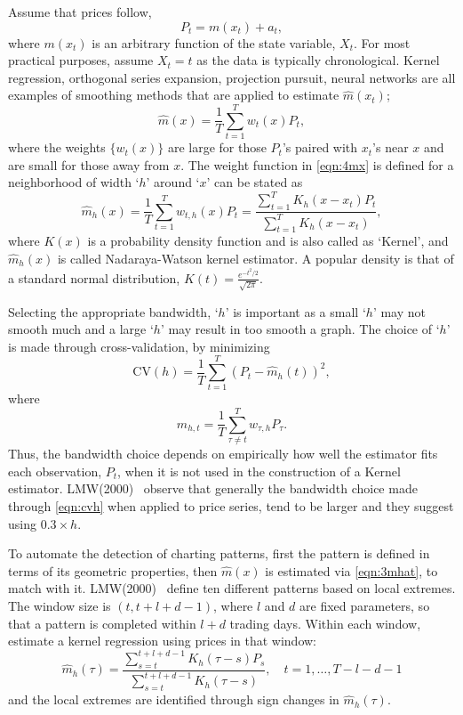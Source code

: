 Assume that prices follow,
	\begin{equation} \label{eqn:4pt}
	P_{t} = m(x_{t}) + a_{t},
	\end{equation}
where $m(x_{t})$ is an arbitrary function of the state variable, $X_{t}$. For most practical purposes, assume $X_{t}= t$ as the data is typically chronological. Kernel regression, orthogonal series expansion, projection pursuit, neural networks are all examples of smoothing methods that are applied to estimate $\hat{m}(x_{t})$;
	\begin{equation} \label{eqn:4mx}
	\hat{m}(x) = \frac{1}{T} \sum_{t=1}^Tw_{t}(x)P_{t},
	\end{equation}
where the weights $\{w_{t}(x)\}$ are large for those $P_{t}$'s paired with $x_{t}$'s near $x$ and are small for those away from $x$. The weight function in \eqref{eqn:4mx} is defined for a neighborhood of width `$h$'  around `$x$' can be stated as
	\begin{equation} \label{eqn:3mhat}
	\hat{m}_{h}(x) = \frac{1}{T}\sum_{t=1}^T w_{t,h}(x)P_{t} = \dfrac{\sum_{t=1}^T K_{h}(x-x_{t})P_{t}}{\sum_{t=1}^T K_{h}(x-x_{t})},
	\end{equation}
where $K(x)$ is a probability density function and is also called as `Kernel', and $\hat{m}_{h}(x)$ is called Nadaraya-Watson kernel estimator. A popular density is that of a standard normal distribution, $K(t)=\frac{e^{-t^2/2}}{\sqrt{2\pi}}$.


Selecting the appropriate bandwidth, `$h$' is important as a small `$h$' may not smooth much and a large `$h$' may result in too smooth a graph. The choice of `$h$' is made through cross-validation, by minimizing
	\begin{equation}\label{eqn:cvh}
	\text{CV}(h) = \frac{1}{T}\sum_{t=1}^T (P_{t} - \hat{m}_{h}(t))^2,
	\end{equation}
where
	\begin{equation}\label{eqn:mht}
	\hat{m}_{h,t} = \frac{1}{T}\sum_{\tau\not=t}^T w_{\tau,h}P_{\tau}.
	\end{equation}
Thus, the bandwidth choice depends on empirically how well the estimator fits each observation, $P_{t}$, when it is not used in the construction of a Kernel estimator. LMW(2000)~\cite{LoMWang} observe that generally the bandwidth choice made through \eqref{eqn:cvh} when applied to price series, tend to be larger and they suggest using $0.3 \times h$.


To automate the detection of charting patterns, first the pattern is defined in terms of its geometric properties, then $\hat{m}(x)$ is estimated via \eqref{eqn:3mhat}, to match with it. LMW(2000)~\cite{LoMWang} define ten different patterns based on local extremes. The window size is $(t,t+l+d-1)$, where $l$ and $d$ are fixed parameters, so that a pattern is completed within $l+d$ trading days. Within each window, estimate  a kernel regression using prices in that window:
	\begin{equation} \label{eqn:longhat}
	\hat{m}_{h}(\tau) = \dfrac{\sum_{s = t}^{t+l+d-1}K_{h}(\tau - s)P_{s}}{\sum_{s = t}^{t+l+d-1}K_{h}(\tau - s)}, \quad t = 1,\ldots , T-l-d-1
	\end{equation}
and the local extremes are identified through sign changes in $\hat{m}_{h}(\tau)$.


